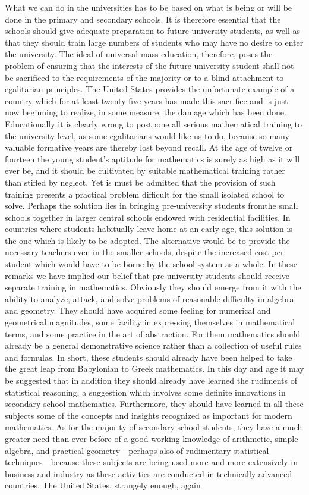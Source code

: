 What we can do in the universities has to be based on what is being or will be done in the primary and secondary schools. It is therefore essential that the schools should give adequate preparation to future university students, as well as that they should train large numbers of students who may have no desire to enter the university. The ideal of universal mass education, therefore, poses the problem of ensuring that the interests of the future university student shall not be sacrificed to the requirements of the majority or to a blind attachment to egalitarian principles. The United States provides the unfortunate example of a country which for at least twenty-five years has made this sacrifice and is just now beginning to realize, in some measure, the damage which has been done. Educationally it is clearly wrong to postpone all serious mathematical training to the university level, as some egalitarians would like us to do, because so many valuable formative years are thereby lost beyond recall. At the age of twelve or fourteen the young student's aptitude for mathematics is surely as high as it will ever be, and it should be cultivated by suitable mathematical training rather than stifled by neglect. Yet is must be admitted that the provision of such training presents a practical problem difficult for the small isolated school to solve. Perhaps the solution lies in bringing pre-university students from\pageoriginale the small schools together in larger central schools endowed with residential facilities. In countries where students habitually leave home at an early age, this solution is the one which is likely to be adopted. The alternative would be to provide the necessary teachers even in the smaller schools, despite the increased cost per student which would have to be borne by the school system as a whole. In these remarks we have implied our belief that pre-university students should receive separate training in mathematics. Obviously they should emerge from it with the ability to analyze, attack, and solve problems of reasonable difficulty in algebra and geometry. They should have acquired some feeling for numerical and geometrical magnitudes, some facility in expressing themselves in mathematical terms, and some practice in the art of abstraction. For them mathematics should already be a general demonstrative science rather than a collection of useful rules and formulas. In short, these students should already have been helped to take the great leap from Babylonian to Greek mathematics. In this day and age it may be suggested that in addition they should already have learned the rudiments of statistical reasoning, a suggestion which involves some definite innovations in secondary school mathematics. Furthermore, they should have learned in all these subjects some of the concepts and insights recognized as important for modern mathematics. As for the majority of secondary school students, they have a much greater need than ever before of a good working knowledge of arithmetic, simple algebra, and practical geometry---perhaps also of rudimentary statistical techniques---because these subjects are being used more and more extensively in business and industry as these activities are conducted in technically advanced countries. The United States, strangely enough, again 